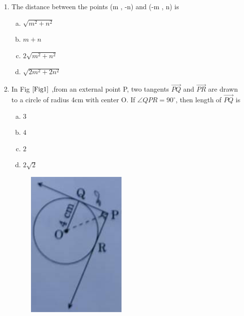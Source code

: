 \documentclass[journal,12pt,twocolumn]{IEEEtran}
\begin{document}
\begin{enumerate}[label=1.\arabic*]
\item The distance between the points (m , -n) and (-m , n) is\\
\begin{enumerate}[(a)]
    \item $\sqrt{m^2 + n^2}$\\
    \item $m + n$\\ 
    \item $2\sqrt{m^2 + n^2}$\\
    \item $\sqrt{2m^2 + 2n^2}$\\
\end{enumerate}

\item In Fig $\ref{Fig1}$ ,from an external point P, two tangents $\Vec{PQ}$ and $\Vec{PR}$ are drawn to a circle of radius 4cm with center O. If $\angle{QPR} = 90^\circ$, then length of $\Vec{PQ}$ is\\
\begin{enumerate}[(a)]
    \item $3$\\
    \item $4$\\ 
    \item $2$\\
    \item $2\sqrt{2}$\\
\end{enumerate}

\begin{figure}[h!]
    \centering
    \includegraphics[width=0.5\columnwidth,center]{Fig1.png}
	\caption{}
	\label{Fig1}
 \end{figure}
 

\end{enumerate}
\end{document}
